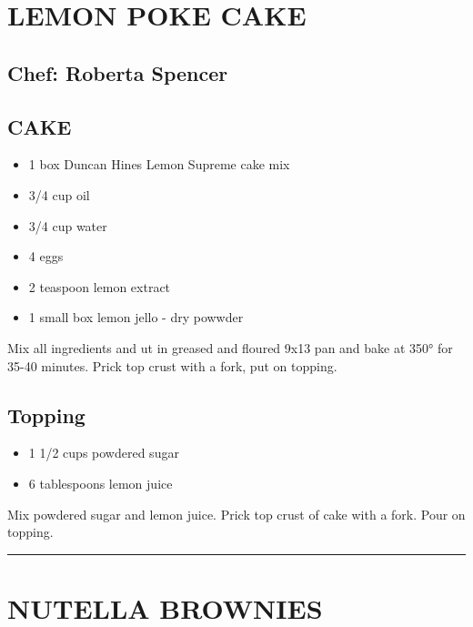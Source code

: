 \documentclass[
]{book}
\providecommand{\tightlist}{%
  \setlength{\itemsep}{0pt}\setlength{\parskip}{0pt}}
\begin{document}
\hypertarget{lemon-poke-cake}{%
\section*{LEMON POKE CAKE}\label{lemon-poke-cake}}


\hypertarget{chef-roberta-spencer-30}{%
\subsection*{Chef: Roberta Spencer}\label{chef-roberta-spencer-30}}


\hypertarget{cake}{%
\subsection*{CAKE}\label{cake}}


\begin{itemize}
\tightlist
\item
  1 box Duncan Hines Lemon Supreme cake mix
\item
  3/4 cup oil
\item
  3/4 cup water
\item
  4 eggs
\item
  2 teaspoon lemon extract
\item
  1 small box lemon jello - dry powwder
\end{itemize}

Mix all ingredients and ut in greased and floured 9x13 pan and bake at 350° for 35-40 minutes. Prick top crust with a fork, put on topping.

\hypertarget{topping}{%
\subsection*{Topping}\label{topping}}


\begin{itemize}
\tightlist
\item
  1 1/2 cups powdered sugar
\item
  6 tablespoons lemon juice
\end{itemize}

Mix powdered sugar and lemon juice. Prick top crust of cake with a fork. Pour on topping.

\begin{center}\rule{0.5\linewidth}{0.5pt}\end{center}

\hypertarget{nutella-brownies}{%
\section*{NUTELLA BROWNIES}\label{nutella-brownies}}
\end{document}
